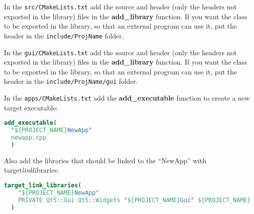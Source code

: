 
In the \texttt{src/CMakeLists.txt} add the source and header (only the
headers not exported in the library) files in the \textbf{add\_library}
function. If you want the class to be exported in the library, so that
an external program can use it, put the header in the
\texttt{include/ProjName} folder.



In the \texttt{gui/CMakeLists.txt} add the source and header (only the
headers not exported in the library) files in the \textbf{add\_library}
function. If you want the class to be exported in the library, so that
an external program can use it, put the header in the
\texttt{include/ProjName/gui} folder.



In the \texttt{apps/CMakeLists.txt} add the \textbf{add\_executable}
function to create a new target executable:

\begin{lstlisting}[language=cmake]
  add_executable(
  "${PROJECT_NAME}NewApp"
  newapp.cpp
  )
\end{lstlisting}

Also add the libraries that should be linked to the ``NewApp'' with
target\emph{link}libraries:

\begin{lstlisting}[language=cmake]
  target_link_libraries(
    "${PROJECT_NAME}NewApp"
    PRIVATE Qt5::Gui Qt5::Widgets "${PROJECT_NAME}Gui" ${PROJECT_NAME} ${SUBMODULES_NAME}
  )
\end{lstlisting}
